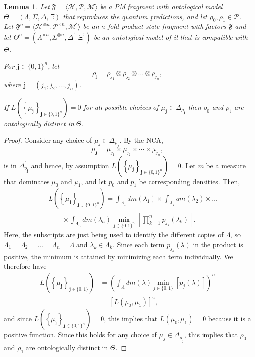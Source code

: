 \documentclass[DIV=calc,paper=a4,fontsize=11pt,twocolumn]{scrartcl} %
\theoremstyle{definition}
\theoremstyle{plain}
\newtheorem{lemma}[definition]{Lemma}
\newcommand{\Hilb}[1][]{\ensuremath{\mathcal{H}_{#1}}}
\begin{document}
\begin{lemma}
\label{lem:Main:prod}
Let $\mathfrak{F} = \langle \Hilb, \mathcal{P}, \mathcal{M} \rangle$
be a PM fragment with ontological model $\Theta = (\Lambda, \Sigma,
\Delta, \Xi)$ that reproduces the quantum predictions, and let
$\rho_0, \rho_1 \in \mathcal{P}$.  Let $\mathfrak{F}^n = \langle
\Hilb^{\otimes n}, \mathcal{P}^{\times n}, \mathcal{M}^{\prime}
\rangle$ be an $n$-fold product state fragment with factors
$\mathfrak{F}$ and let $\Theta^n = (\Lambda^{\times n},
\Sigma^{\otimes n}, \Delta^{\prime}, \Xi^{\prime})$ be an
ontological model of it that is compatible with $\Theta$.

For $\bm{j} \in \{0,1\}^n$, let
\begin{equation}
\rho_{\bm{j}} = \rho_{j_1} \otimes \rho_{j_2} \otimes \ldots
\otimes \rho_{j_n},
\end{equation}
where $\bm{j} = (j_1,j_2,\ldots,j_n)$.

If $L \left ( \left \{ \mu_{\bm{j}}\right \}_{\bm{j} \in \{0,1\}^n}
\right ) = 0$ for all possible choices of $\mu_{\bm{j}} \in
\Delta^{\prime}_{\rho_{\bm{j}}}$ then $\rho_0$ and $\rho_1$ are
ontologically distinct in $\Theta$.
\end{lemma}
\begin{proof}
Consider any choice of $\mu_j \in \Delta_{\rho_j}$.  By the NCA,
\begin{equation}
\mu_{\bm{j}} = \mu_{j_1} \times \mu_{j_2} \times \cdots \times \mu_{j_n},
\end{equation}
is in $\Delta^{\prime}_{\rho_{\bm{j}}}$ and hence, by assumption $L
\left ( \left \{ \mu_{\bm{j}}\right \}_{\bm{j} \in \{0,1\}^n}\right
) = 0$.  Let $m$ be a measure that dominates $\mu_0$ and $\mu_1$,
and let $p_0$ and $p_1$ be corresponding densities. Then,
\begin{eqnarray}
&&L \left ( \left \{ \mu_{\bm{j}}\right \}_{\bm{j} \in \{0,1\}^n}\right ) =
\int_{\Lambda_1} dm(\lambda_1) \times \int_{\Lambda_2} dm(\lambda_2)
\times\ldots\nonumber\\ &&\quad\quad \times \int_{\Lambda_n} dm(\lambda_n)
\min_{\bm{j} \in \{0,1\}^n} \left [ \prod_{k = 1}^n p_{j_k}(\lambda_k)
\right ].
\end{eqnarray}
Here, the subscripts are just being used to identify the different
copies of $\Lambda$, so $\Lambda_1 = \Lambda_2 = \ldots = \Lambda_n
= \Lambda$ and $\lambda_k \in \Lambda_k$.  Since each term
$p_{j_k}(\lambda)$ in the product is positive, the minimum is
attained by minimizing each term individually.  We therefore have
\begin{align}
L \left ( \left \{ \mu_{\bm{j}}\right \}_{\bm{j} \in \{0,1\}} \right ) &
= \left ( \int_{\Lambda}dm(\lambda) \min_{j \in \{0,1\}} \left
[ p_{j}(\lambda) \right ] \right )^n \\
& = \left [ L \left ( \mu_0, \mu_1 \right ) \right ]^n,
\end{align}
and since $L \left ( \left \{ \mu_{\bm{j}}\right \}_{\bm{j} \in
\{0,1\}^n} \right ) = 0$, this implies that $L \left ( \mu_0,
\mu_1\right ) = 0$ because it is a positive function.  Since this
holds for any choice of $\mu_j \in \Delta_{\rho_j}$, this implies
that $\rho_0$ and $\rho_1$ are ontologically distinct in $\Theta$.
\end{proof}
\end{document}
